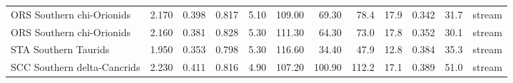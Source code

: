 \begin{tabular}{lrrrrrrrrrrl}
ORS Southern chi-Orionids                    & 2.170 & 0.398 & 0.817 & 5.10 & 109.00 & 69.30 & 78.4 & 17.9 & 0.342 & 31.7 & stream \\
ORS Southern chi-Orionids                    & 2.160 & 0.381 & 0.828 & 5.30 & 111.30 & 64.30 & 73.0 & 17.8 & 0.352 & 30.1 & stream \\
STA Southern Taurids                         & 1.950 & 0.353 & 0.798 & 5.30 & 116.60 & 34.40 & 47.9 & 12.8 & 0.384 & 35.3 & stream \\
SCC Southern delta-Cancrids                  & 2.230 & 0.411 & 0.816 & 4.90 & 107.20 & 100.90 & 112.2 & 17.1 & 0.389 & 51.0 & stream \\
\bottomrule
\end{tabular}
